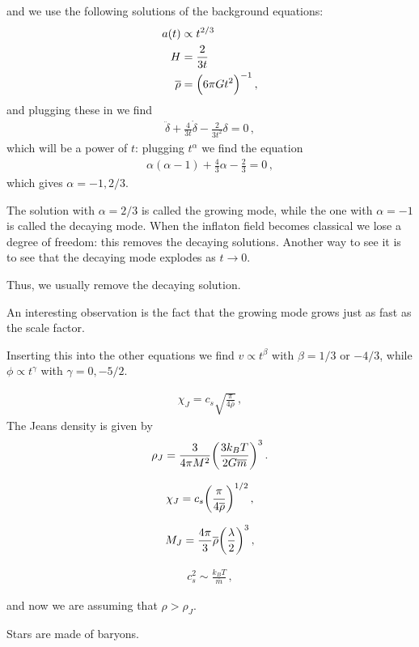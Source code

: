 \documentclass[main.tex]{subfiles}
\begin{document}
and we use the following solutions of the background equations: 
%
\begin{align}
  a(t ) &\propto t^{2/3}  \\
  H &= \frac{2}{3t}  \\
\overline{\rho} &= \qty(6 \pi G t^2)^{-1}
\,,
\end{align}
%
and plugging these in we find 
%
\begin{align}
  \ddot{\delta} + \frac{4}{3t} \dot{\delta} - \frac{2}{3t^2} \delta = 0
\,,
\end{align}
%
which will be a power of \(t\): plugging \(t^{\alpha }\) we find the equation 
%
\begin{align}
  \alpha (\alpha -1) + \frac{4}{3} \alpha - \frac{2}{3} =0 
\,,
\end{align}
%
which gives \(\alpha = -1, 2/3\). 

The solution with \(\alpha = 2/3\) is called the growing mode, while the one with \(\alpha = -1\) is called the decaying mode. 
When the inflaton field becomes classical we lose a degree of freedom: this removes the decaying solutions. 
Another way to see it is to see that the decaying mode explodes as \(t \rightarrow 0\). 

Thus, we usually remove the decaying solution. 

An interesting observation is the fact that the growing mode grows just as fast as the scale factor. 

Inserting this into the other equations we find \(v \propto t^{\beta } \) with \(\beta = 1/3\) or \(-4/3\), while \(\phi \propto t^{\gamma }\) with \(\gamma = 0, -5/2\). 

%
\begin{align}
    \chi_{J} = c_s \sqrt{\frac{\pi}{4 \overline{\rho}}}
  \,,
  \end{align}
%
The Jeans density is given by 
%
\begin{align}
  \rho_{J} = \frac{3}{4 \pi M^2} \qty(\frac{3k_B T}{2G \overline{m}})^{3}
\,.
\end{align}
%

%
\begin{align}
  \chi_J = c_s \qty(\frac{\pi}{4 \overline{\rho}})^{1/2}
\,,
\end{align}
%

%
\begin{align}
  M_J = \frac{4 \pi }{3} \overline{\rho} \qty(\frac{\lambda}{2})^{3}
\,,
\end{align}
%

%
\begin{align}
  c_s^2 \sim \frac{k_B T}{\overline{m}}
\,,
\end{align}
%

and now we are assuming that \(\rho > \rho _J\). 

Stars are made of baryons. 
\end{document}
